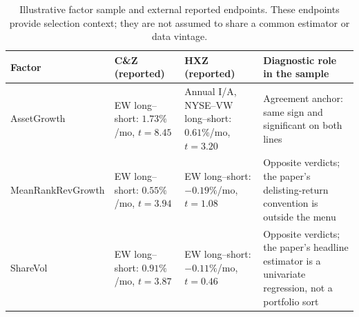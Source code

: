 \begin{table}[htbp]
  \centering
  \footnotesize
  \setlength{\tabcolsep}{3pt}
  \renewcommand{\arraystretch}{1.08}
  \caption{Illustrative factor sample and external reported endpoints. These
    endpoints provide selection context; they are not assumed to share a
    common estimator or data vintage.}
  \label{tab:roster}
  \begin{tabular}{@{}p{2.35cm}p{3.2cm}p{3.45cm}p{5.35cm}@{}}
    \toprule
    Factor & C\&Z (reported) & HXZ (reported) & Diagnostic role in the sample \\
    \midrule
    AssetGrowth & EW long--short: $1.73\%$/mo, $t=8.45$ & Annual I/A, NYSE--VW long--short: $0.61\%$/mo, $t=3.20$ & Agreement anchor: same sign and significant on both lines \\
    \addlinespace
    Mean\-Rank\-Rev\-Growth & EW long--short: $0.55\%$/mo, $t=3.94$ & EW long--short: $-0.19\%$/mo, $t=1.08$ & Opposite verdicts; the paper's delisting-return convention is outside the menu \\
    \addlinespace
    ShareVol & EW long--short: $0.91\%$/mo, $t=3.87$ & EW long--short: $-0.11\%$/mo, $t=0.46$ & Opposite verdicts; the paper's headline estimator is a univariate regression, not a portfolio sort \\
    \bottomrule
  \end{tabular}
\end{table}
